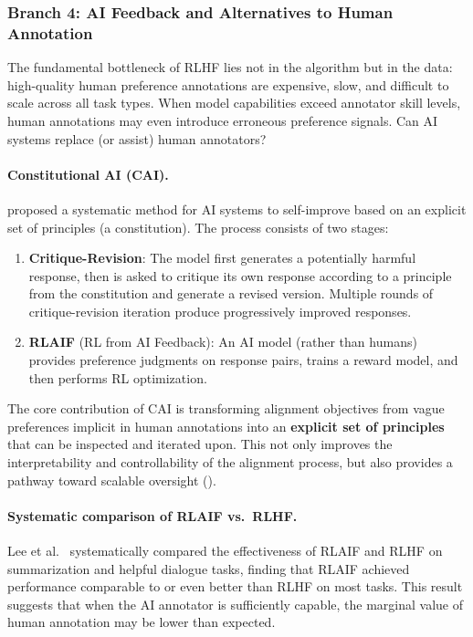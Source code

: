 \subsubsection{Branch 4: AI Feedback and Alternatives to Human Annotation}
\label{sec:t2-ai-feedback}

\begin{problembox}
The fundamental bottleneck of RLHF lies not in the algorithm but in the data:
high-quality human preference annotations are expensive, slow, and difficult to scale across all task types.
When model capabilities exceed annotator skill levels, human annotations may even introduce erroneous preference signals.
Can AI systems replace (or assist) human annotators?
\end{problembox}

\paragraph{Constitutional AI (CAI).}
 proposed a systematic method
for AI systems to self-improve based on an explicit set of principles (a constitution).
The process consists of two stages:
\begin{enumerate}[leftmargin=2em]
  \item \textbf{Critique-Revision}:
    The model first generates a potentially harmful response, then is asked to critique its own response
    according to a principle from the constitution and generate a revised version.
    Multiple rounds of critique-revision iteration produce progressively improved responses.
  \item \textbf{RLAIF} (RL from AI Feedback):
    An AI model (rather than humans) provides preference judgments on response pairs,
    trains a reward model, and then performs RL optimization.
\end{enumerate}

\noindent
The core contribution of CAI is transforming alignment objectives from vague preferences implicit in human annotations
into an \textbf{explicit set of principles} that can be inspected and iterated upon.
This not only improves the interpretability and controllability of the alignment process,
but also provides a pathway toward scalable oversight
().

\paragraph{Systematic comparison of RLAIF vs.\ RLHF.}
Lee et al.\ \cite{lee2023rlaif} systematically compared
the effectiveness of RLAIF and RLHF on summarization and helpful dialogue tasks,
finding that RLAIF achieved performance comparable to or even better than RLHF on most tasks.
This result suggests that when the AI annotator is sufficiently capable,
the marginal value of human annotation may be lower than expected.

